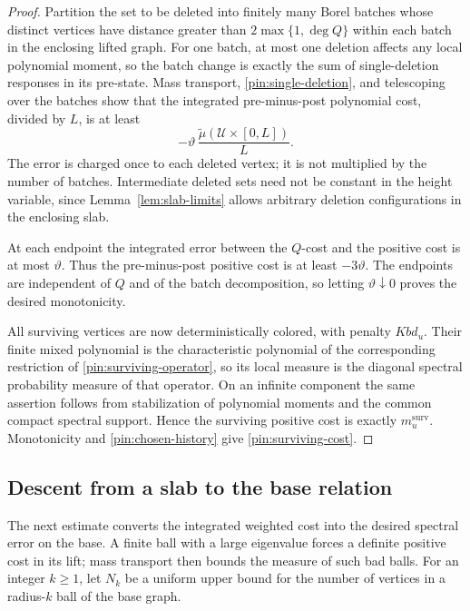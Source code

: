 \begin{proof}
Partition the set to be deleted into finitely many Borel batches whose
distinct vertices have distance greater than
$2\max\{1,\deg Q\}$ within each batch in the enclosing lifted
graph.  For one batch, at most one deletion affects any local
polynomial moment, so the batch change is exactly the sum of
single-deletion responses in its pre-state.  Mass transport,
\eqref{pin:single-deletion}, and telescoping over the batches show
that the integrated pre-minus-post polynomial cost, divided by $L$,
is at least
\[
 -\vartheta\,
   \frac{\widetilde\mu(\mathcal U\times[0,L])}{L}.
\]
The error is charged once to each deleted vertex; it is not multiplied
by the number of batches.  Intermediate deleted sets need not be
constant in the height variable, since Lemma~\ref{lem:slab-limits}
allows arbitrary deletion configurations in the enclosing slab.

At each endpoint the integrated error between the $Q$-cost and the
positive cost is at most $\vartheta$.  Thus the pre-minus-post
positive cost is at least $-3\vartheta$.  The endpoints are independent
of $Q$ and of the batch decomposition, so letting $\vartheta\downarrow0$
proves the desired monotonicity.

All surviving vertices are now deterministically colored, with penalty
$Kbd_u$.  Their finite mixed polynomial is the characteristic
polynomial of the corresponding restriction of
\eqref{pin:surviving-operator}, so its local measure is the diagonal
spectral probability measure of that operator.  On an infinite
component the same assertion follows from stabilization of polynomial
moments and the common compact spectral support.  Hence the surviving
positive cost is exactly $m_u^{\mathrm{surv}}$.  Monotonicity and
\eqref{pin:chosen-history} give \eqref{pin:surviving-cost}.
\end{proof}

\subsection{Descent from a slab to the base relation}

The next estimate converts the integrated weighted cost into the desired
spectral error on the base. A finite ball with a large eigenvalue forces
a definite positive cost in its lift; mass transport then bounds the
measure of such bad balls. For an integer $k\geq1$, let $N_k$ be a
uniform upper bound for the number of vertices in a radius-$k$ ball of
the base graph.

